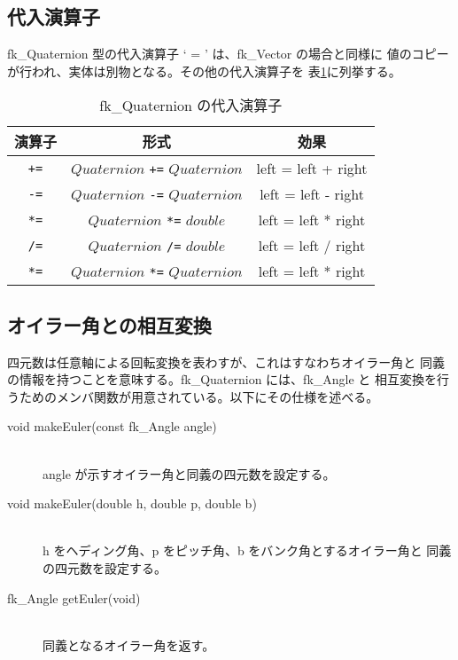 \subsection{代入演算子}
fk\_Quaternion 型の代入演算子 ` = ' は、fk\_Vector の場合と同様に
値のコピーが行われ、実体は別物となる。その他の代入演算子を
表\ref{tbl:fkQ3}に列挙する。
\begin{table}[H]
\caption{fk\_Quaternion の代入演算子}
\label{tbl:fkQ3}
\begin{center}
\begin{tabular}{|c|c|c|}
\hline
演算子 & 形式 & 効果 \\ \hline \hline
\verb-+=- & \(Quaternion\) \verb-+=- \(Quaternion\) &
	left = left + right \\ \hline
\verb+-=+ & \(Quaternion\) \verb+-=+ \(Quaternion\) &
	left = left - right \\ \hline
\verb+*=+ & \(Quaternion\) \verb+*=+ \(double\) &
	left = left * right \\ \hline
\verb+/=+ & \(Quaternion\) \verb+/=+ \(double\) &
	left = left / right \\ \hline
\verb+*=+ & \(Quaternion\) \verb+*=+ \(Quaternion\) &
	left = left * right \\ \hline
\end{tabular}
\end{center}
\end{table}
\subsection{オイラー角との相互変換}
四元数は任意軸による回転変換を表わすが、これはすなわちオイラー角と
同義の情報を持つことを意味する。fk\_Quaternion には、fk\_Angle と
相互変換を行うためのメンバ関数が用意されている。以下にその仕様を述べる。

\begin{description}
\item[void makeEuler(const fk\_Angle angle)] ~ \\
angle が示すオイラー角と同義の四元数を設定する。\\

\item[void makeEuler(double h, double p, double b)] ~ \\
h をヘディング角、p をピッチ角、b をバンク角とするオイラー角と
同義の四元数を設定する。\\

\item[fk\_Angle getEuler(void)] ~ \\
同義となるオイラー角を返す。
\end{description}

